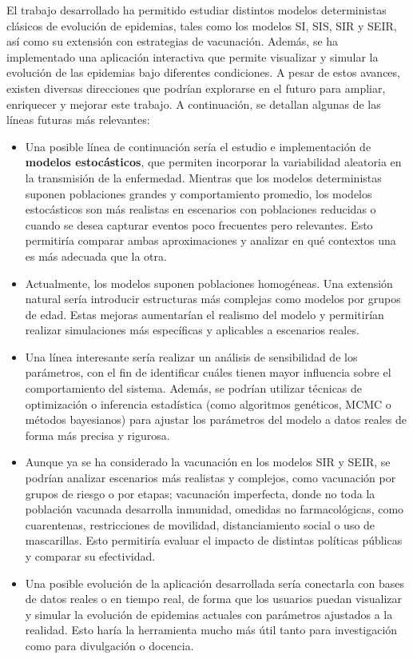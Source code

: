 El trabajo desarrollado ha permitido estudiar distintos modelos deterministas clásicos de evolución de epidemias, tales como los modelos SI, SIS, SIR y SEIR, así como su extensión con estrategias de vacunación. Además, se ha implementado una aplicación interactiva que permite visualizar y simular la evolución de las epidemias bajo diferentes condiciones. A pesar de estos avances, existen diversas direcciones que podrían explorarse en el futuro para ampliar, enriquecer y mejorar este trabajo. A continuación, se detallan algunas de las líneas futuras más relevantes:
\begin{itemize}
    \item Una posible línea de continuación sería el estudio e implementación de \textbf{modelos estocásticos}, que permiten incorporar la variabilidad aleatoria en la transmisión de la enfermedad. Mientras que los modelos deterministas suponen poblaciones grandes y comportamiento promedio, los modelos estocásticos son más realistas en escenarios con poblaciones reducidas o cuando se desea capturar eventos poco frecuentes pero relevantes. Esto permitiría comparar ambas aproximaciones y analizar en qué contextos una es más adecuada que la otra.
    \item Actualmente, los modelos suponen poblaciones homogéneas. Una extensión natural sería introducir estructuras más complejas como modelos por grupos de edad. Estas mejoras aumentarían el realismo del modelo y permitirían realizar simulaciones más específicas y aplicables a escenarios reales.
    \item Una línea interesante sería realizar un análisis de sensibilidad de los parámetros, con el fin de identificar cuáles tienen mayor influencia sobre el comportamiento del sistema. Además, se podrían utilizar técnicas de optimización o inferencia estadística (como algoritmos genéticos, MCMC o métodos bayesianos) para ajustar los parámetros del modelo a datos reales de forma más precisa y rigurosa.
    \item Aunque ya se ha considerado la vacunación en los modelos SIR y SEIR, se podrían analizar escenarios más realistas y complejos, como vacunación por grupos de riesgo o por etapas; vacunación imperfecta, donde no toda la población vacunada desarrolla inmunidad, omedidas no farmacológicas, como cuarentenas, restricciones de movilidad, distanciamiento social o uso de mascarillas. Esto permitiría evaluar el impacto de distintas políticas públicas y comparar su efectividad.
    \item Una posible evolución de la aplicación desarrollada sería conectarla con bases de datos reales o en tiempo real, de forma que los usuarios puedan visualizar y simular la evolución de epidemias actuales con parámetros ajustados a la realidad. Esto haría la herramienta mucho más útil tanto para investigación como para divulgación o docencia.

\end{itemize}
